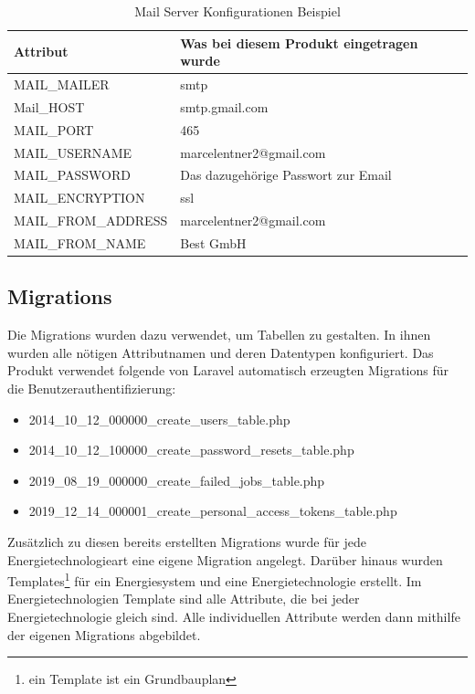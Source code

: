 \begin{table}[h]
	
	\begin{tabular}{|l|l|}
		\hline
		Attribut         & Was bei diesem Produkt eingetragen wurde                      \\ \hline
		MAIL\_MAILER     & smtp                     \\ \hline
		Mail\_HOST          & smtp.gmail.com         \\ \hline
		MAIL\_PORT       & 465 \\ \hline
		MAIL\_USERNAME      & marcelentner2@gmail.com  \\ \hline
		MAIL\_PASSWORD   & Das dazugehörige Passwort zur Email                \\ \hline
		MAIL\_ENCRYPTION    & ssl                             \\ \hline
		MAIL\_FROM\_ADDRESS & marcelentner2@gmail.com                       \\ \hline
		MAIL\_FROM\_NAME & Best GmbH  \\ \hline
	\end{tabular}
	\caption{Mail Server Konfigurationen Beispiel}
	\label{sec: Mail Server Konfigurationen Beispiel}
\end{table}


\subsection{Migrations}
Die Migrations wurden dazu verwendet, um Tabellen zu gestalten. In ihnen wurden alle nötigen Attributnamen und deren Datentypen konfiguriert. Das Produkt verwendet folgende von Laravel automatisch erzeugten Migrations für die Benutzerauthentifizierung: 
\begin{itemize}
\item 2014\_10\_12\_000000\_create\_users\_table.php
\item 2014\_10\_12\_100000\_create\_password\_resets\_table.php
\item 2019\_08\_19\_000000\_create\_failed\_jobs\_table.php
\item 2019\_12\_14\_000001\_create\_personal\_access\_tokens\_table.php
\end{itemize}
Zusätzlich zu diesen bereits erstellten Migrations wurde für jede Energietechnologieart eine eigene Migration angelegt. Darüber hinaus wurden Templates\footnote{ein Template ist ein Grundbauplan} für ein Energiesystem und eine Energietechnologie erstellt. Im Energietechnologien Template sind alle Attribute, die bei jeder Energietechnologie gleich sind. Alle individuellen Attribute werden dann mithilfe der eigenen Migrations abgebildet.
\newpage

